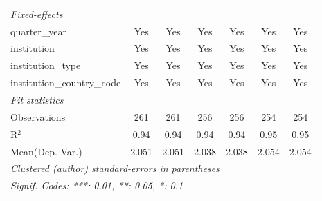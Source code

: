 \begin{tabular}{lcccccc}
   \midrule
   \emph{Fixed-effects}\\
   quarter\_year                      & Yes     & Yes        & Yes     & Yes        & Yes        & Yes\\  
   institution                        & Yes     & Yes        & Yes     & Yes        & Yes        & Yes\\  
   institution\_type                  & Yes     & Yes        & Yes     & Yes        & Yes        & Yes\\  
   institution\_country\_code         & Yes     & Yes        & Yes     & Yes        & Yes        & Yes\\  
   \midrule
   \emph{Fit statistics}\\
   Observations                       & 261     & 261        & 256     & 256        & 254        & 254\\  
   R$^2$                              & 0.94    & 0.94       & 0.94    & 0.94       & 0.95       & 0.95\\  
Mean(Dep. Var.) & 2.051 & 2.051 & 2.038 & 2.038 & 2.054 & 2.054 \\
   \midrule \midrule
   \multicolumn{7}{l}{\emph{Clustered (author) standard-errors in parentheses}}\\
   \multicolumn{7}{l}{\emph{Signif. Codes: ***: 0.01, **: 0.05, *: 0.1}}\\
\end{tabular}
\par\endgroup
